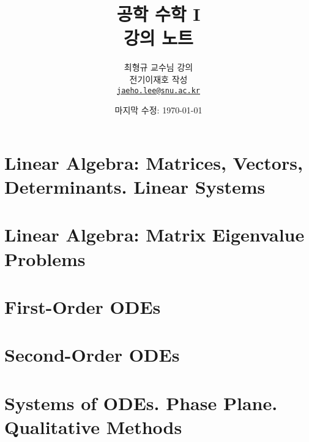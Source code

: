 \documentclass[unfonts,oneside,a4paper]{oblivoir}
\title{공학 수학 I\\강의 노트}
\author{최형규 교수님 강의\vspace{0.3cm}\\전기\textperiodcentered정보공학부 이재호 작성\\\href{mailto:jaeho.lee@snu.ac.kr}{\texttt{jaeho.lee@snu.ac.kr}}}
\date{마지막 수정: \today}
\theoremstyle{definition}
\theoremstyle{theorem}
\theoremstyle{theorem}
\theoremstyle{remark}
\theoremstyle{remark}
\theoremstyle{remark}
\theoremstyle{remark}
\begin{document}
\maketitle

\setcounter{section}{6}
\reversemarginpar{}
\section{Linear Algebra: Matrices, Vectors, Determinants. Linear Systems}


\section{Linear Algebra: Matrix Eigenvalue Problems}


\setcounter{section}{0}
\section{First-Order ODEs}


\section{Second-Order ODEs}


\setcounter{section}{3}
\section{Systems of ODEs. Phase Plane. Qualitative Methods}

\end{document}
